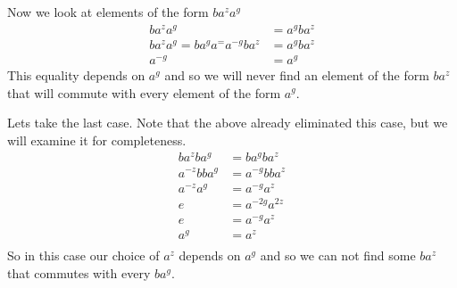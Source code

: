 \documentclass[letterpaper]{article}
\begin{document}
\begin{enumerate}
\begin{enumerate}
    Now we look at elements of the form $ba^za^g$
    \begin{align*}
      ba^za^g&=a^{g}ba^z\\
      ba^za^g=ba^ga^=a^{-g}ba^z&=a^{g}ba^z\\
      a^{-g}&=a^{g}
    \end{align*}
    This equality depends on $a^g$ and so we will never find an element of the form $ba^z$ that will commute with every element of the form $a^g$.

    Lets take the last case.
    Note that the above already eliminated this case, but we will examine it for completeness.
    \begin{align*}
      ba^zba^g&=ba^gba^z\\
      a^{-z}bba^g&=a^{-g}bba^z\\
      a^{-z}a^g&=a^{-g}a^z\\
      e&=a^{-2g}a^{2z}\\
      e&=a^{-g}a^{z}\\
      a^{g}&=a^{z}\\
    \end{align*}
    So in this case our choice of $a^z$ depends on $a^g$ and so we can not find some $ba^z$ that commutes with every $ba^g$.


\end{enumerate}
\end{enumerate}
\end{document}
